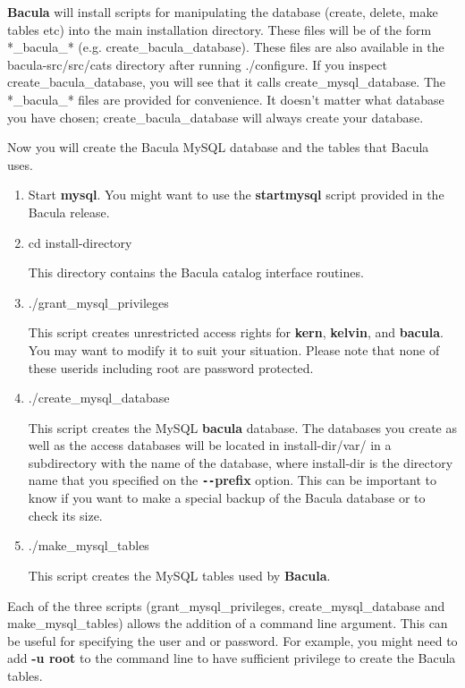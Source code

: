 {{{{{\bf Bacula} will install scripts for manipulating the database (create,
delete, make tables etc) into the main installation directory. These files
will be of the form *\_bacula\_* (e.g. create\_bacula\_database). These files
are also available in the \lt{}bacula-src\gt{}/src/cats directory after
running ./configure. If you inspect create\_bacula\_database, you will see
that it calls create\_mysql\_database. The *\_bacula\_* files are provided for
convenience. It doesn't matter what database you have chosen;
create\_bacula\_database will always create your database. 

Now you will create the Bacula MySQL database and the tables that Bacula uses.


\begin{enumerate}
\item Start {\bf mysql}. You might want to use the {\bf startmysql}  script
   provided in the Bacula release.  
\item cd \lt{}install-directory\gt{}

   This directory contains the Bacula catalog  interface routines.  

\item ./grant\_mysql\_privileges

   This script creates unrestricted access rights for  {\bf kern}, {\bf kelvin},
and {\bf bacula}. You may  want to modify it to suit your situation. Please
note that  none of these userids including root are password protected.  

\item ./create\_mysql\_database

   This script creates the MySQL {\bf bacula} database.  The databases you create
as well as the access databases  will be located in \lt{}install-dir\gt{}/var/
in a subdirectory  with the name of the database, where \lt{}install-dir\gt{}
is the  directory name that you specified on the {\bf \verb{--{prefix} option. This 
can be important to know if you want to make a special backup  of the Bacula
database or to check its size.  

\item ./make\_mysql\_tables

   This script creates the MySQL tables used by {\bf Bacula}. 
\end{enumerate}

Each of the three scripts (grant\_mysql\_privileges, create\_mysql\_database
and make\_mysql\_tables) allows the addition of a command line argument. This
can be useful for specifying the user and or password. For example, you might
need to add {\bf -u root} to the command line to have sufficient privilege to
create the Bacula tables. 

}}}}
